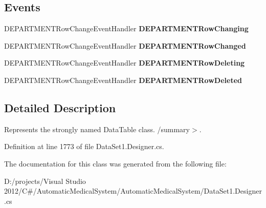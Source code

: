 \subsection*{Events}
\begin{CompactItemize}
\item 
DEPARTMENTRowChangeEventHandler \textbf{DEPARTMENTRowChanging}\label{class_automatic_medical_system_1_1_data_set1_1_1_d_e_p_a_r_t_m_e_n_t_data_table_070b90b8c9c9ff76625983de483e267e}

\item 
DEPARTMENTRowChangeEventHandler \textbf{DEPARTMENTRowChanged}\label{class_automatic_medical_system_1_1_data_set1_1_1_d_e_p_a_r_t_m_e_n_t_data_table_891814f3358a15144809d4043a6bc147}

\item 
DEPARTMENTRowChangeEventHandler \textbf{DEPARTMENTRowDeleting}\label{class_automatic_medical_system_1_1_data_set1_1_1_d_e_p_a_r_t_m_e_n_t_data_table_e2231297ef79b14dabc8b3b8eedab039}

\item 
DEPARTMENTRowChangeEventHandler \textbf{DEPARTMENTRowDeleted}\label{class_automatic_medical_system_1_1_data_set1_1_1_d_e_p_a_r_t_m_e_n_t_data_table_0e8eec5cb44b0ef4b00acf9a852bcbaf}

\end{CompactItemize}


\subsection{Detailed Description}
Represents the strongly named DataTable class. /summary$>$. 

Definition at line 1773 of file DataSet1.Designer.cs.

The documentation for this class was generated from the following file:\begin{CompactItemize}
\item 
D:/projects/Visual Studio 2012/C\#/AutomaticMedicalSystem/AutomaticMedicalSystem/DataSet1.Designer.cs\end{CompactItemize}
